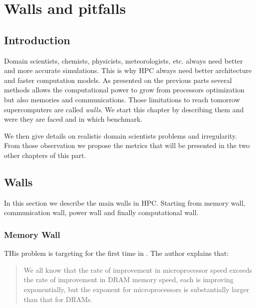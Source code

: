 
\chapter{Walls and pitfalls}

\section{Introduction}
Domain scientists, chemists, physicists, meteorologists, etc. always need better and more accurate simulations. 
This is why HPC always need better architecture and faster computation models. 
As presented on the previous parts several methods allows the computational power to grow from processors optimization but also memories and communications. 
Those limitations to reach tomorrow supercomputers are called \textit{walls}.
We start this chapter by describing them and were they are faced and in which benchmark.

We then give details on realistic domain scientists problems and irregularity.
From those observation we propose the metrics that will be presented in the two other chapters of this part. 

\section{Walls}
In this section we describe the main walls in HPC.
Starting from memory wall, communication wall, power wall and finally computational wall.

\subsection{Memory Wall}
THis problem is targeting for the first time in \cite{wulf1995hitting}.
The author explains that:

\begin{quotation} We all know that the rate of improvement in microprocessor speed exceeds the rate of
improvement in DRAM memory speed, each is improving exponentially, but the
exponent for microprocessors is substantially larger than that for DRAMs.
\end{quotation} 

